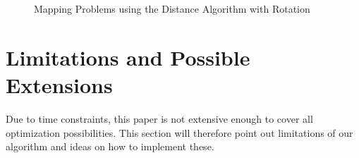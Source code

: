 \documentclass[twoside, 12pt]{article}
\begin{document}
\begin{figure}
\vspace{-100pt}
\end{figure}

\begin{figure}
\vspace{-28pt}
  \begin{center}
  \end{center}
\vspace{-20pt}
  \caption{Mapping Problems using the Distance Algorithm with Rotation}
  \label{fig:secondMappingProblems}
\vspace{12pt}
\end{figure}

\begin{figure}
\vspace{-50pt}
\end{figure}

\section{Limitations and Possible Extensions}
\label{sec:limitations}
Due to time constraints, this paper is not extensive enough to cover all optimization possibilities. This section will therefore point out limitations of our algorithm and ideas on how to implement these.
\end{document}
